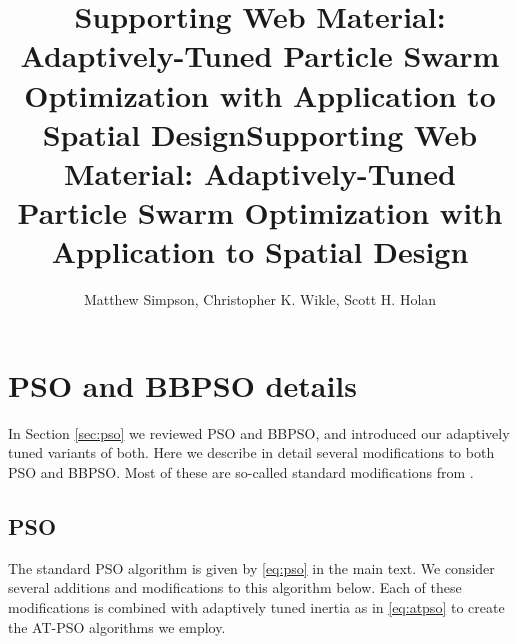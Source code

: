 \documentclass[cmbright]{staauth}
\numberwithin{table}{section}
\begin{document}
\blind
{
  \title{Supporting Web Material: Adaptively-Tuned Particle Swarm Optimization with Application to Spatial Design}
  \author{Matthew Simpson\corrauth, Christopher K. Wikle, Scott H. Holan}
  \address{Department of Statistics, University of Missouri, 146 Middlebush Hall, Columbia, MO 65211-6100\\
U.S. Census Bureau, 4600 Silver Hill Road, Washington, D.C. 20233-9100}
  \received{}
  \accepted{}
}\fi

\blind
{
  \title{Supporting Web Material: Adaptively-Tuned Particle Swarm Optimization with Application to Spatial Design}
  \author{}
  \address{}
  \corremail{}
  \received{}
  \accepted{}
}\fi

\maketitle

\appendix
\renewcommand*{\thesection}{S\arabic{section}}
\renewcommand*{\theequation}{S.\arabic{equation}}

\section{PSO and BBPSO details}\label{app:psodetail}

In Section \ref{sec:pso} we reviewed PSO and BBPSO, and introduced our adaptively tuned variants of both. Here we describe in detail several modifications to both PSO and BBPSO. Most of these are so-called standard modifications from \cite{clerc2011spso}.

\subsection{PSO}\label{subapp:pso}
The standard PSO algorithm is given by \eqref{eq:pso} in the main text. We consider several additions and modifications to this algorithm below. Each of these modifications is combined with adaptively tuned inertia as in \eqref{eq:atpso} to create the AT-PSO algorithms we employ.
\end{document}

